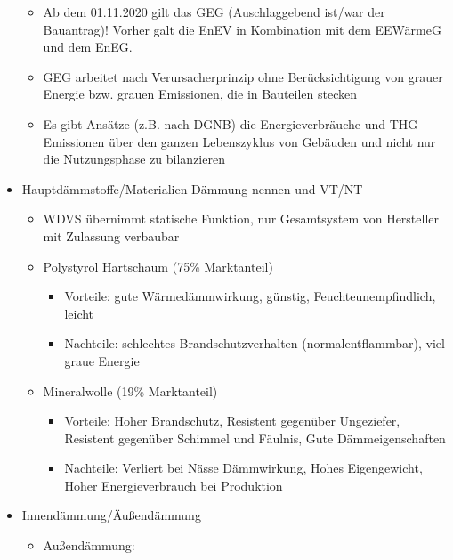 \documentclass[fleqn,twoside,dvipsnames]{article}
\begin{document}
\begin{itemize}
\begin{itemize}
                    \item Ab dem 01.11.2020 gilt das GEG (Auschlaggebend ist/war der Bauantrag)! Vorher galt die EnEV in Kombination mit dem EEWärmeG und dem EnEG.
                    \item GEG arbeitet nach Verursacherprinzip ohne Berücksichtigung von grauer Energie bzw. grauen Emissionen, die in Bauteilen stecken
                    \item Es gibt Ansätze (z.B. nach DGNB) die Energieverbräuche und THG-Emissionen über den ganzen Lebenszyklus von Gebäuden und nicht nur die Nutzungsphase zu bilanzieren
                \end{itemize}
            \item Hauptdämmstoffe/Materialien Dämmung nennen und VT/NT
                \begin{itemize}
                    \item WDVS übernimmt statische Funktion, nur Gesamtsystem von Hersteller mit Zulassung verbaubar
                    \item Polystyrol Hartschaum (75\% Marktanteil)
                        \begin{itemize}
                            \item Vorteile: gute Wärmedämmwirkung, günstig, Feuchteunempfindlich, leicht
                            \item Nachteile: schlechtes Brandschutzverhalten (normalentflammbar), viel graue Energie
                        \end{itemize}
                    \item Mineralwolle (19\% Marktanteil)
                        \begin{itemize}
                            \item Vorteile: Hoher Brandschutz, Resistent gegenüber Ungeziefer, Resistent gegenüber Schimmel und Fäulnis, Gute Dämmeigenschaften
                            \item Nachteile: Verliert bei Nässe Dämmwirkung, Hohes Eigengewicht, Hoher Energieverbrauch bei Produktion
                        \end{itemize}
                \end{itemize}
            \item Innendämmung/Äußendämmung
                \begin{itemize}
                    \item Außendämmung:
                        \begin{itemize}

\end{itemize}
\end{itemize}
\end{itemize}
\end{document}
